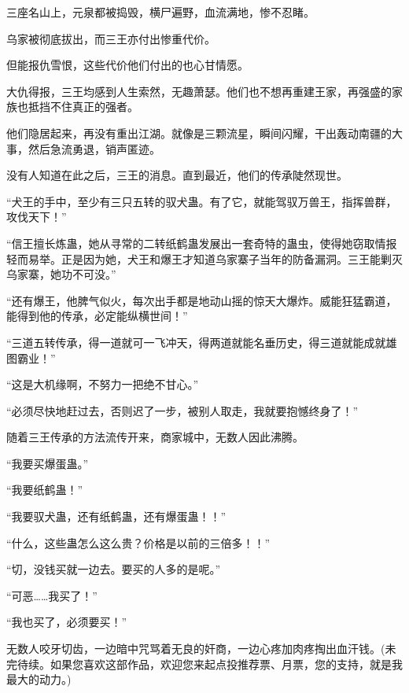 \begin{this_body}
三座名山上，元泉都被捣毁，横尸遍野，血流满地，惨不忍睹。

乌家被彻底拔出，而三王亦付出惨重代价。

但能报仇雪恨，这些代价他们付出的也心甘情愿。

大仇得报，三王均感到人生索然，无趣萧瑟。他们也不想再重建王家，再强盛的家族也抵挡不住真正的强者。

他们隐居起来，再没有重出江湖。就像是三颗流星，瞬间闪耀，干出轰动南疆的大事，然后急流勇退，销声匿迹。

没有人知道在此之后，三王的消息。直到最近，他们的传承陡然现世。

“犬王的手中，至少有三只五转的驭犬蛊。有了它，就能驾驭万兽王，指挥兽群，攻伐天下！”

“信王擅长炼蛊，她从寻常的二转纸鹤蛊发展出一套奇特的蛊虫，使得她窃取情报轻而易举。正是因为她，犬王和爆王才知道乌家寨子当年的防备漏洞。三王能剿灭乌家寨，她功不可没。”

“还有爆王，他脾气似火，每次出手都是地动山摇的惊天大爆炸。威能狂猛霸道，能得到他的传承，必定能纵横世间！”

“三道五转传承，得一道就可一飞冲天，得两道就能名垂历史，得三道就能成就雄图霸业！”

“这是大机缘啊，不努力一把绝不甘心。”

“必须尽快地赶过去，否则迟了一步，被别人取走，我就要抱憾终身了！”

随着三王传承的方法流传开来，商家城中，无数人因此沸腾。

“我要买爆蛋蛊。”

“我要纸鹤蛊！”

“我要驭犬蛊，还有纸鹤蛊，还有爆蛋蛊！！”

“什么，这些蛊怎么这么贵？价格是以前的三倍多！！”

“切，没钱买就一边去。要买的人多的是呢。”

“可恶……我买了！”

“我也买了，必须要买！”

无数人咬牙切齿，一边暗中咒骂着无良的奸商，一边心疼加肉疼掏出血汗钱。(未完待续。如果您喜欢这部作品，欢迎您来起点投推荐票、月票，您的支持，就是我最大的动力。)

\end{this_body}

